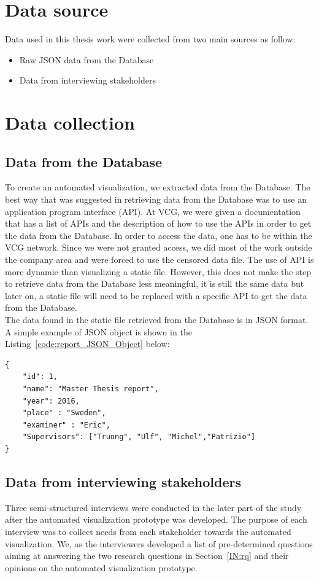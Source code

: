 \section{Data source}
Data used in this thesis work were collected from two main sources as follow:
\vspace{0.2em}
\begin{itemize}
    \item Raw JSON data from the Database
    \item Data from interviewing stakeholders
\end{itemize}
\vspace{0.2em}

\section{Data collection}
\subsection{Data from the Database}
To create an automated visualization, we extracted data from the Database. The best way that was suggested in retrieving data from the Database was to use an application program interface (API). At VCG, we were given a documentation that has a list of APIs and the description of how to use the APIs in order to get the data from the Database. In order to access the data, one has to be within the VCG network. Since we were not granted access, we did most of the work outside the company area and were forced to use the censored data file. The use of API is more dynamic than visualizing a static file. However, this does not make the step to retrieve data from the Database less meaningful, it is still the same data but later on, a static file will need to be replaced with a specific API to get the data from the Database.\\

The data found in the static file retrieved from the Database is in JSON format. A simple example of JSON object is shown in the  Listing~\ref{code:report_JSON_Object} below:

\begin{lstlisting}[caption=An example of JSON object, label=code:report_JSON_Object]
{
    "id": 1,
    "name": "Master Thesis report",
    "year": 2016,
    "place" : "Sweden",
    "examiner" : "Eric",
    "Supervisors": ["Truong", "Ulf", "Michel","Patrizio"]
}
\end{lstlisting}


\subsection{Data from interviewing stakeholders}
\label{ME:data_from_interviewing_stakeholders}
Three semi-structured interviews were conducted in the later part of the study after the automated visualization prototype was developed. The purpose of each interview was to collect needs from each stakeholder towards the automated visualization. We, as the interviewers developed a list of pre-determined questions aiming at answering the two research questions in Section~\ref{IN:rq} and their opinions on the automated visualization prototype.\\


